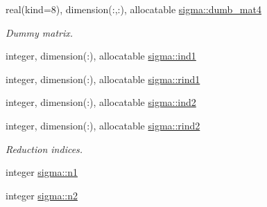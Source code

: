 \begin{DoxyCompactItemize}
real(kind=8), dimension(\+:,\+:), allocatable \hyperlink{namespacesigma_a74080d7fa465ba8581e0b40c20170d5f}{sigma\+::dumb\+\_\+mat4}
\begin{DoxyCompactList}\small\item\em Dummy matrix. \end{DoxyCompactList}\item 
integer, dimension(\+:), allocatable \hyperlink{namespacesigma_a3f8dbbf3b119812ecc38f3e2cb0dcdf2}{sigma\+::ind1}
\item 
integer, dimension(\+:), allocatable \hyperlink{namespacesigma_ae2753201d5fd5cf3ab0d5b103b9eb27a}{sigma\+::rind1}
\item 
integer, dimension(\+:), allocatable \hyperlink{namespacesigma_a5f8dd1d30a05aa1b77988cf43e9664bb}{sigma\+::ind2}
\item 
integer, dimension(\+:), allocatable \hyperlink{namespacesigma_afd4965b46adc2446101f6f3bf072e28f}{sigma\+::rind2}
\begin{DoxyCompactList}\small\item\em Reduction indices. \end{DoxyCompactList}\item 
integer \hyperlink{namespacesigma_a99bf91cd11d1a6d59216fceee65b9b4b}{sigma\+::n1}
\item 
integer \hyperlink{namespacesigma_a4019bcd3294851992406e2f6a284413b}{sigma\+::n2}
\end{DoxyCompactItemize}
